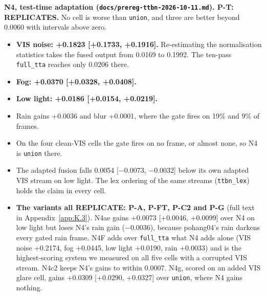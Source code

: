 \documentclass[10pt]{article}
\begin{document}
\textbf{N4, test-time adaptation (\texttt{docs/\allowbreak{}prereg-ttbn-2026-10-11.md}). P-T: REPLICATES.} No cell is worse than \texttt{union}, and three are better beyond 0.0060 with intervals above zero.
\begin{itemize}
\item \textbf{VIS noise: +0.1823 [+0.1733, +0.1916].} Re-estimating the normalisation statistics takes the fused output from 0.0169 to 0.1992. The ten-pass \texttt{full\_\allowbreak{}tta} reaches only 0.0206 there.
\item \textbf{Fog: +0.0370 [+0.0328, +0.0408].}
\item \textbf{Low light: +0.0186 [+0.0154, +0.0219].}
\item Rain gains +0.0036 and blur +0.0001, where the gate fires on 19\% and 9\% of frames.
\item On the four clean-VIS cells the gate fires on no frame, or almost none, so N4 is \texttt{union} there.
\item The adapted fusion falls 0.0054 [$-$0.0073, $-$0.0032] below its own adapted VIS stream on low light. The lex ordering of the same streams (\texttt{ttbn\_\allowbreak{}lex}) holds the claim in every cell.
\item \textbf{The variants all REPLICATE: P-A, P-FT, P-C2 and P-G} (full text in Appendix~\ref{app:K.3}). N4ae gains +0.0073 [+0.0046, +0.0099] over N4 on low light but loses N4's rain gain ($-$0.0036), because pohang04's rain darkens every gated rain frame. N4F adds over \texttt{full\_\allowbreak{}tta} what N4 adds alone (VIS noise +0.2174, fog +0.0445, low light +0.0190, rain +0.0033) and is the highest-scoring system we measured on all five cells with a corrupted VIS stream. N4c2 keeps N4's gains to within 0.0007. N4g, scored on an added VIS glare cell, gains +0.0309 [+0.0290, +0.0327] over \texttt{union}, where N4 gains nothing.
\end{itemize}
\end{document}
